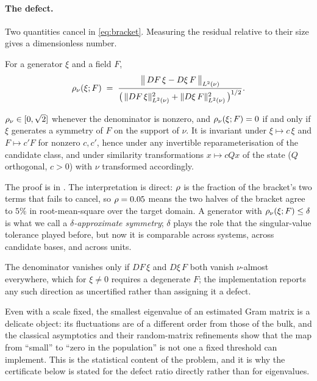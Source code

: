 \paragraph{The defect.} Two quantities cancel in \eqref{eq:bracket}. Measuring
the residual relative to their size gives a dimensionless number.

\begin{definition}
\label{def:defect}
For a generator $\xi$ and a field $F$,
\begin{equation}
  \rho_\nu(\xi; F) \;=\;
  \frac{\bigl\| \,DF\,\xi - D\xi\,F\, \bigr\|_{L^2(\nu)}}
       {\bigl(\,\|DF\,\xi\|_{L^2(\nu)}^{2}
        + \|D\xi\,F\|_{L^2(\nu)}^{2}\,\bigr)^{1/2}} .
\end{equation}
\end{definition}

\begin{lemma}[Properties]
\label{lem:props}
$\rho_\nu \in [0,\sqrt 2]$ whenever the denominator is nonzero, and
$\rho_\nu(\xi;F)=0$ if and only if $\xi$ generates a symmetry of $F$ on the
support of $\nu$. It is invariant under $\xi \mapsto c\,\xi$ and $F \mapsto
c'F$ for nonzero $c,c'$, hence under any invertible reparameterisation of the
candidate class, and under similarity transformations $x \mapsto cQx$ of the
state ($Q$ orthogonal, $c>0$) with $\nu$ transformed accordingly.
\end{lemma}

The proof is in . The interpretation is direct: $\rho$ is
the fraction of the bracket's two terms that fails to cancel, so
$\rho = 0.05$ means the two halves of the bracket agree to $5\%$ in
root-mean-square over the target domain. A generator with $\rho_\nu(\xi;F)
\le \delta$ is what we call a \emph{$\delta$-approximate symmetry}; $\delta$
plays the role that the singular-value tolerance played before, but now it is
comparable across systems, across candidate bases, and across units.

The denominator vanishes only if $DF\,\xi$ and $D\xi\,F$ both vanish
$\nu$-almost everywhere, which for $\xi \neq 0$ requires a degenerate $F$; the
implementation reports any such direction as uncertified rather than assigning
it a defect.

\begin{remark}
Even with a scale fixed, the smallest eigenvalue of an estimated Gram matrix is
a delicate object: its fluctuations are of a different order from those of the
bulk, and the classical asymptotics \citep{anderson1963asymptotic} and their
random-matrix refinements \citep{johnstone2001distribution,baik2005phase} show
that the map from ``small'' to ``zero in the population'' is not one a fixed
threshold can implement. This is the statistical content of the problem, and it
is why the certificate below is stated for the defect ratio directly rather than
for eigenvalues.
\end{remark}

